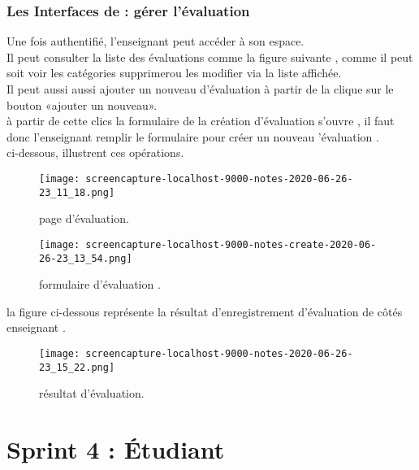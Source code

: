\begin{itemize}
\subsubsection{Les Interfaces de : gérer l'évaluation  }
Une fois authentifié,  l'enseignant peut accéder à son espace. \\ 
Il peut consulter la liste  des évaluations comme la figure suivante
, comme il peut soit voir les catégories  supprimerou les modifier
via la liste affichée.  \\
Il peut aussi aussi ajouter un nouveau d'évaluation à partir de  la clique sur le bouton «ajouter un nouveau».  \\
à partir de cette clics la formulaire de la création d'évaluation s'ouvre , il faut donc  l'enseignant remplir le formulaire  pour créer un nouveau 'évaluation . \\
ci-dessous, illustrent ces opérations.
\medskip
\medskip
\medskip
\begin{figure}[ht]
	\centering
	\texttt{[image: screencapture-localhost-9000-notes-2020-06-26-23\_11\_18.png]}
	\caption{page d'évaluation.}
	\label{fig:page d'évaluation }
\end{figure}
\FloatBarrier
\begin{figure}[ht]
	\centering
	\texttt{[image: screencapture-localhost-9000-notes-create-2020-06-26-23\_13\_54.png]}
	\caption{formulaire d'évaluation .}
	\label{fig:formulaire d'évaluation }
\end{figure}
\FloatBarrier
la figure ci-dessous représente la résultat  d'enregistrement d'évaluation de côtés enseignant .
\begin{figure}[ht]
	\centering
	\texttt{[image: screencapture-localhost-9000-notes-2020-06-26-23\_15\_22.png]}
	\caption{résultat d'évaluation.}
	\label{fig:résultat d'évaluation }
\end{figure}
\FloatBarrier
\clearpage
	
\end{itemize}


\clearpage
\section{Sprint 4 : Étudiant}
\label{sec:conception}

